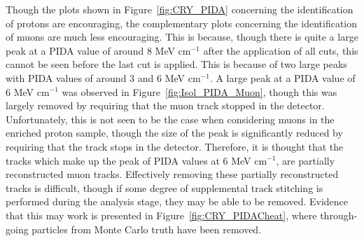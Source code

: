 Though the plots shown in Figure~\ref{fig:CRY_PIDA} concerning the identification of protons are encouraging, the complementary plots concerning the identification of muons are much less encouraging. This is because, though there is quite a large peak at a PIDA value of around 8 MeV cm$^{-1}$ after the application of all cuts, this cannot be seen before the last cut is applied. This is because of two large peaks with PIDA values of around 3 and 6 MeV cm$^{-1}$. A large peak at a PIDA value of 6 MeV cm$^{-1}$ was observed in Figure~\ref{fig:Isol_PIDA_Muon}, though this was largely removed by requiring that the muon track stopped in the detector. Unfortunately, this is not seen to be the case when considering muons in the enriched proton sample, though the size of the peak is significantly reduced by requiring that the track stops in the detector. Therefore, it is thought that the tracks which make up the peak of PIDA values at 6 MeV cm$^{-1}$, are partially reconstructed muon tracks. Effectively removing these partially reconstructed tracks is difficult, though if some degree of supplemental track stitching is performed during the analysis stage, they may be able to be removed. Evidence that this may work is presented in Figure~\ref{fig:CRY_PIDACheat}, where through-going particles from Monte Carlo truth have been removed. \\


